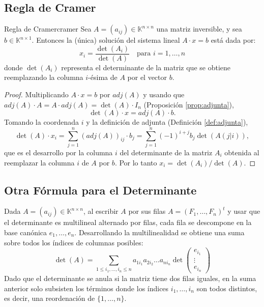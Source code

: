 \documentclass[11pt, a4paper]{article}
\begin{document}
\subsection{Regla de Cramer}

\begin{proposicion}{Regla de Cramer}{cramer}
Sea $A=(a_{ij}) \in \mathbb{K}^{n \times n}$ una matriz inversible, y sea $b \in \mathbb{K}^{n \times 1}$.
Entonces la (única) solución del sistema lineal $A \cdot x = b$ está dada por:
\[
x_i = \frac{\det(A_i)}{\det(A)} \quad \text{para } i=1, \dots, n
\]
donde $\det(A_i)$ representa el determinante de la matriz que se obtiene reemplazando la columna $i$-ésima de $A$ por el vector $b$.
\end{proposicion}

\begin{proof}
Multiplicando $A \cdot x = b$ por $adj(A)$ y usando que $adj(A) \cdot A = A \cdot adj(A) = \det(A) \cdot I_n$ (Proposición \ref{prop:adjunta}),
\[
\det(A) \cdot x = adj(A) \cdot b.
\]
Tomando la coordenada $i$ y la definición de adjunta (Definición \ref{def:adjunta}),
\[
\det(A) \cdot x_i = \sum_{j=1}^{n} (adj(A))_{ij} \cdot b_j = \sum_{j=1}^{n} (-1)^{i+j} b_j \det(A(j|i)),
\]
que es el desarrollo por la columna $i$ del determinante de la matriz $A_i$ obtenida al reemplazar la columna $i$ de $A$ por $b$. Por lo tanto $x_i = \det(A_i)/\det(A)$.
\end{proof}

\subsection{Otra Fórmula para el Determinante}

Dada $A=(a_{ij}) \in \mathbb{K}^{n \times n}$, al escribir $A$ por sus filas $A = (F_1, \dots, F_n)^t$ y usar que el determinante es multilineal alternado por filas, cada fila se descompone en la base canónica $e_1, \dots, e_n$. Desarrollando la multilinealidad se obtiene una suma sobre todos los índices de columnas posibles:
\[
\det(A) = \sum_{1 \le i_1, \dots, i_n \le n} a_{1 i_1} a_{2 i_2} \dots a_{n i_n} \det \begin{pmatrix} e_{i_1} \\ \vdots \\ e_{i_n} \end{pmatrix}
\]
Dado que el determinante se anula si la matriz tiene dos filas iguales, en la suma anterior solo subsisten los términos donde los índices $i_1, \dots, i_n$ son todos distintos, es decir, una reordenación de $\{1, \dots, n\}$.
\end{document}
